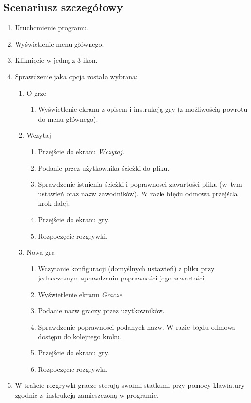 \documentclass[a4paper]{article}
\begin{document}
\subsection{Scenariusz szczegółowy}\label{ss}
\begin{enumerate}
	\item Uruchomienie programu.
	\item Wyświetlenie menu głównego.
	\item Kliknięcie w jedną z 3 ikon.
	\item Sprawdzenie jaka opcja została wybrana:
	\begin{enumerate}
		\item O grze
		\begin{enumerate}
			\item Wyświetlenie ekranu z opisem i instrukcją gry (z możliwością powrotu do menu głównego).
		\end{enumerate}
		\item Wczytaj
        \begin{enumerate}
            \item Przejście do ekranu \textit{Wczytaj}.	
			\item Podanie przez użytkownika ścieżki do pliku.
			\item Sprawdzenie istnienia ścieżki i poprawności zawartości pliku (w~tym ustawień oraz nazw zawodników). W razie błędu odmowa przejścia krok dalej.
			\item Przejście do ekranu gry.
			\item Rozpoczęcie rozgrywki.
        \end{enumerate}
		\item Nowa gra
		\begin{enumerate}
			\item Wczytanie konfiguracji (domyślnych ustawień) z pliku przy jednoczesnym sprawdzaniu poprawności jego zawartości.
			\item Wyświetlenie ekranu \textit{Gracze}.
			\item Podanie nazw graczy przez użytkowników.
			\item Sprawdzenie poprawności podanych nazw. W razie błędu odmowa dostępu do kolejnego kroku.
			\item Przejście do ekranu gry.
			\item Rozpoczęcie rozgrywki.
        \end{enumerate}	
    \end{enumerate}
    \item W trakcie rozgrywki gracze sterują swoimi statkami przy pomocy klawiatury zgodnie z~instrukcją zamieszczoną w programie.

\end{enumerate}
\end{document}
